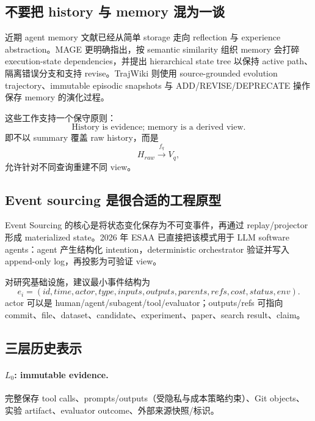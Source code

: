 \documentclass[11pt,a4paper]{ctexart}
\begin{document}
\subsection{不要把 history 与 memory 混为一谈}

近期 agent memory 文献已经从简单 storage 走向 reflection 与 experience abstraction\parencite{luo2026memorysurvey}。MAGE 更明确指出，按 semantic similarity 组织 memory 会打碎 execution-state dependencies，并提出 hierarchical state tree 以保持 active path、隔离错误分支和支持 revise\parencite{chen2026mage}。TrajWiki 则使用 source-grounded evolution trajectory、immutable episodic snapshots 与 ADD/REVISE/DEPRECATE 操作保存 memory 的演化过程\parencite{sun2026trajwiki}。

这些工作支持一个保守原则：
\begin{equation}
\boxed{\text{History is evidence; memory is a derived view.}}
\end{equation}
即不以 summary 覆盖 raw history，而是
\begin{equation}
 H_{raw}\xrightarrow{f_q}V_q,
\end{equation}
允许针对不同查询重建不同 view。

\subsection{Event sourcing 是很合适的工程原型}

Event Sourcing 的核心是将状态变化保存为不可变事件，再通过 replay/projector 形成 materialized state\parencite{fowler2005eventsourcing}。2026 年 ESAA 已直接把该模式用于 LLM software agents：agent 产生结构化 intention，deterministic orchestrator 验证并写入 append-only log，再投影为可验证 view\parencite{santos2026esaa}。

对研究基础设施，建议最小事件结构为
\begin{equation}
 e_i=(id,time,actor,type,inputs,outputs,parents,refs,cost,status,env).
\end{equation}
actor 可以是 human/agent/subagent/tool/evaluator；outputs/refs 可指向 commit、file、dataset、candidate、experiment、paper、search result、claim。

\subsection{三层历史表示}

\paragraph{$L_0$: immutable evidence.}
完整保存 tool calls、prompts/outputs（受隐私与成本策略约束）、Git objects、实验 artifact、evaluator outcome、外部来源快照/标识。
\end{document}
